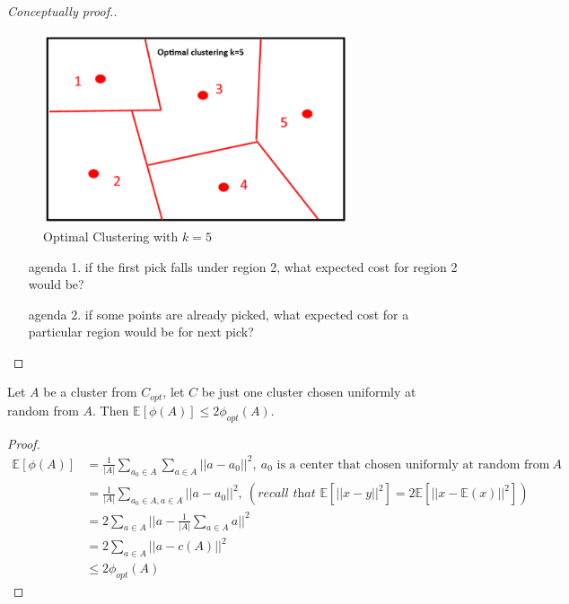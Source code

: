 \begin{proof}[Conceptually proof.]
  \hfill	
  \begin{figure}[H]
    \centering
    \includegraphics[width=0.8\textwidth]{chapter_1/files/optimal_clustering.png}
    \caption{\small Optimal Clustering with $k=5$}
  \end{figure}			
  \begin{enumerate}
    \begingroup\leftskip4em
  \item[agenda 1.] if the first pick falls under region 2, what
    expected cost for region 2 would be? 
  \item[agenda 2.] if some points are already picked, what expected
    cost for a particular region would be for next pick? 
    \par\endgroup
  \end{enumerate}			
\end{proof}

\begin{lemma}
  Let $A$ be a cluster from $C_{opt}$, let $C$ be just one cluster
  chosen uniformly at random from $A$. Then $\mathbb{E}[\phi(A)]\leq
  2\phi_{opt}(A)$. 
\end{lemma}
\begin{proof}
  \hfill
  \begin{align*}
    \mathbb{E}[\phi(A)] &=\frac{1}{|A|}\sum_{a_0\in A}\sum_{a\in
      A}||a-a_0||^2, \ a_0\text{ is a center that chosen uniformly at
      random from}\ A\\ 
    &= \frac{1}{|A|}\sum_{a_0\in A, a\in
      A}||a-a_0||^2,\  (\textit{recall that
    }\mathbb{E}[||x-y||^2]=2\mathbb{E}[||x-\mathbb{E}(x)||^2])\\ 
    &=2\sum_{a \in A} ||a-\frac{1}{|A|}\sum_{a \in A}a||^2\\
    &=2\sum_{a \in A} ||a-c(A)||^2\\
    &\leq2\phi_{opt}(A)
  \end{align*}
\end{proof}


